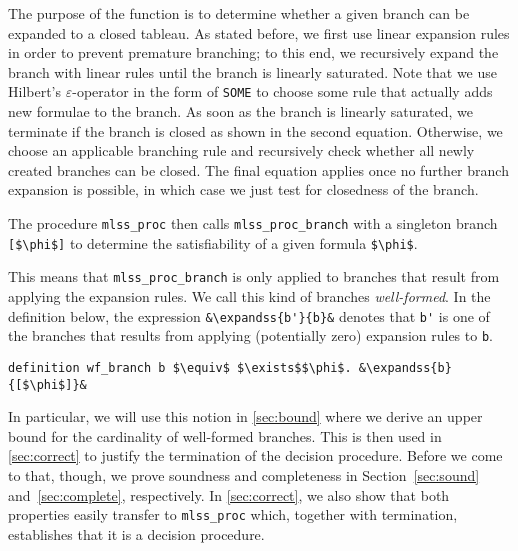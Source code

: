 \documentclass[sigplan,10pt,anonymous,review]{acmart}
\newcommand{\lefttriangle}{\mathrel{\tikz[baseline]{\draw (1ex, 0.75ex) -- (0, 1.25ex) -- (0, 0.25ex) -- cycle;}}}
\newcommand{\expandssSym}{\lefttriangle^*}
\newcommand{\expandss}[2]{#1 $\expandssSym$ #2}
\begin{document}
The purpose of the function is to determine whether a given branch can be expanded to a closed tableau.
As stated before, we first use linear expansion rules in order to prevent premature branching;
to this end, we recursively expand the branch with linear rules until the branch is linearly saturated.
Note that we use Hilbert's $\varepsilon$-operator in the form of \lstinline!SOME! to choose some rule that actually adds new formulae to the branch. 
As soon as the branch is linearly saturated, we terminate if the branch is closed as shown in the second equation.
Otherwise, we choose an applicable branching rule and recursively check whether all newly created branches can be closed.
The final equation applies once no further branch expansion is possible, in which case we just test for closedness of the branch.

The procedure \lstinline!mlss_proc! then calls \lstinline!mlss_proc_branch! with a singleton branch \lstinline![$\phi$]! to determine the satisfiability of a given formula \lstinline!$\phi$!.

This means that \lstinline!mlss_proc_branch! is only applied to branches that result from applying the expansion rules.
We call this kind of branches \textit{well-formed}.
In the definition below, the expression \lstinline!&\expandss{b'}{b}&! denotes that \lstinline!b'! is one of the branches that results from applying (potentially zero) expansion rules to \lstinline!b!.
\begin{lstlisting}
definition wf_branch b $\equiv$ $\exists$$\phi$. &\expandss{b}{[$\phi$]}&
\end{lstlisting}

In particular, we will use this notion in \autoref{sec:bound} where we derive an upper bound for the cardinality of well-formed branches.
This is then used in \autoref{sec:correct} to justify the termination of the decision procedure. 
Before we come to that, though, we prove soundness and completeness in Section~\ref{sec:sound} and~\ref{sec:complete}, respectively.
In \autoref{sec:correct}, we also show that both properties easily transfer to \lstinline!mlss_proc! which, together with termination, establishes that it is a decision procedure.
\end{document}
